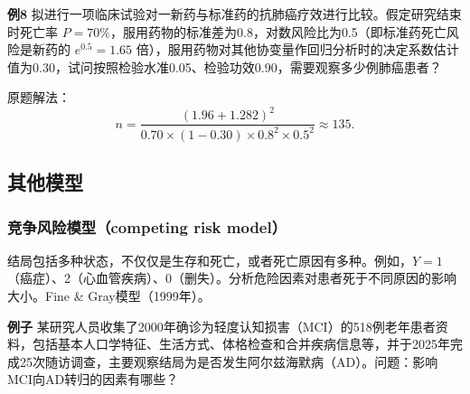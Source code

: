 \textbf{例8} 拟进行一项临床试验对一新药与标准药的抗肺癌疗效进行比较。假定研究结束时死亡率 $P=70\%$，服用药物的标准差为0.8，对数风险比为0.5（即标准药死亡风险是新药的 $e^{0.5}=1.65$ 倍），服用药物对其他协变量作回归分析时的决定系数估计值为0.30，试问按照检验水准0.05、检验功效0.90，需要观察多少例肺癌患者？

原题解法：
\[
n=\frac{(1.96+1.282)^2}{0.70\times(1-0.30)\times0.8^2\times0.5^2}\approx135.
\]
\subsection{其他模型}
\subsubsection{竞争风险模型（competing risk model）}
结局包括多种状态，不仅仅是生存和死亡，或者死亡原因有多种。例如，$Y=1$（癌症）、2（心血管疾病）、0（删失）。分析危险因素对患者死于不同原因的影响大小。Fine \& Gray模型（1999年）。

\textbf{例子} 某研究人员收集了2000年确诊为轻度认知损害（MCI）的518例老年患者资料，包括基本人口学特征、生活方式、体格检查和合并疾病信息等，并于2025年完成25次随访调查，主要观察结局为是否发生阿尔兹海默病（AD）。问题：影响MCI向AD转归的因素有哪些？

